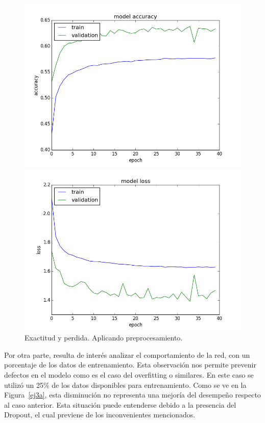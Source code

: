 \documentclass{article}[12pt, a4paper]
\begin{document}
\begin{figure}[h!]
	\begin{minipage}[h]{0.49\textwidth}
		\includegraphics[width=\textwidth]{ej2acc}
	\end{minipage}
	\begin{minipage}[h]{0.49\textwidth}
		\includegraphics[width=\textwidth]{ej2loss}
	\end{minipage}
	\caption{Exactitud y perdida. Aplicando preprocesamiento.}
	\label{ej2}
\end{figure}
\vfil
\newpage
Por otra parte, resulta de inter\'es analizar el comportamiento de la red,
con un porcentaje de los datos de entrenamiento. Esta observaci\'on nos permite
prevenir defectos en el modelo como es el caso del overfitting o similares. En
este caso se utiliz\'o un 25\% de los datos disponibles para entrenamiento. Como
se ve en la Figura~\ref{ej3a}, esta disminuci\'on no representa una mejor\'ia del
desempe\~no respecto al caso anterior. Esta situaci\'on puede entenderse debido a la
presencia del Dropout, el cual previene de los inconvenientes mencionados.
\end{document}
